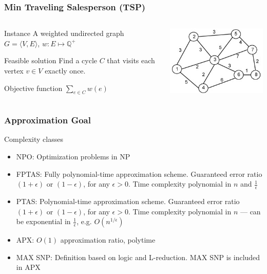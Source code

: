 \documentclass[12pt,aspectratio=169]{beamer}
\begin{document}
\begin{frame}\frametitle{Min Traveling Salesperson (TSP)}
\begin{columns} 
  \begin{column}{0.48\textwidth}
  \begin{block}{Instance}
    A weighted undirected graph $G=\langle V,E \rangle$, $w:E\mapsto \mathbb{Q}^{+}$
  \end{block}
  \begin{block}{Feasible solution}
    Find a cycle $C$ that visits each vertex  $v\in V$ exactly once.
%
  \end{block}
  \begin{block}{Objective function}
    $\sum_{e\in C}w(e)$
  \end{block}
\end{column}
    \begin{column}{0.48\textwidth}
      \centering
  \includegraphics[height=0.5\textheight]{img/tsp}
\end{column}
\end{columns}
\end{frame}

\begin{frame}\frametitle{Approximation Goal }
  \begin{block}{Complexity classes}
    \begin{itemize}
    \item
      NPO: Optimization problems in NP
    \item
      FPTAS: Fully polynomial-time approximation scheme.
%
      Guaranteed error ratio $(1+\epsilon)$ or $(1-\epsilon)$, for any $\epsilon > 0$.
%
      Time complexity polynomial in $n$ and $\frac{1}{\epsilon}$
    \item
      PTAS: Polynomial-time approximation scheme.
%
      Guaranteed error ratio $(1+\epsilon)$ or $(1-\epsilon)$, for any $\epsilon > 0$.
%
      Time complexity polynomial in $n$ --- can be exponential in $\frac{1}{\epsilon}$,
      e.g. $O(n^{1/\epsilon})$
    \item
      APX: $O(1)$ approximation ratio, polytime
    \item
      MAX SNP: Definition based on logic and L-reduction.
%
      MAX SNP is included in APX
    \end{itemize}
  \end{block}
\end{frame}
\end{document}
